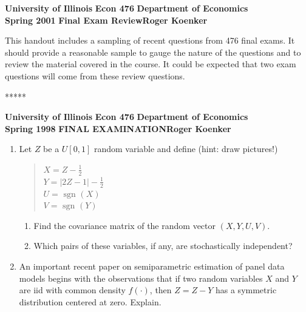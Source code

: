 \setlength{\textwidth}{170mm}
\setlength{\textheight}{230mm}
\setlength{\oddsidemargin}{0mm}
\setlength{\evensidemargin}{10mm}
\setlength{\topmargin}{-10mm}
\def\RR{\hbox{\raise.4ex\hbox{$\scriptstyle{|}$}\hskip-1.85pt R}}
\pagestyle{empty}


\noindent
{\bf University of Illinois} \hfill \large{\bf Econ 476} \hfill {\bf Department of Economics} \\
{\bf Spring 2001} \hfill \large{{\bf Final Exam Review}}\hfill {\bf Roger Koenker}

\vspace{10mm}

\vspace{5mm}
This handout includes a sampling of recent questions from 476 final exams.  
It should provide a reasonable sample to gauge the nature of the questions and 
to review the material covered in the course.  It could be expected that two exam questions will come from these review questions.


\begin{center}
*****
\end{center}

\vspace{10mm}
\noindent
{\bf University of Illinois} \hfill \large{\bf Econ 476} \hfill {\bf Department
of Economics} \\
{\bf Spring 1998} \hfill {\bf FINAL EXAMINATION}\hfill {\bf Roger Koenker}

\vspace{5mm}

\begin{enumerate}
\item Let $Z$ be a $U[0, 1]$ random variable and define (hint:  draw pictures!)
\begin{quote}
$X = Z - \frac{1}{2}$\\
$Y=|2Z-1|-\frac{1}{2}$\\
$U= \mbox{ sgn } (X)$\\
$V= \mbox{ sgn } (Y)$
\end{quote}
\begin{enumerate}
\item Find the covariance matrix of the random vector $(X,Y, U,V).$
\item Which pairs of these variables, if any, are stochastically independent?
\end{enumerate}

\item An important recent paper on semiparametric estimation of panel data
models begins with the observations that if two random variables $X$ and $Y$
are iid with common density $f(\cdot)$, then $Z=Z-Y$ has a symmetric
distribution centered at zero.  Explain.
\end{enumerate}



